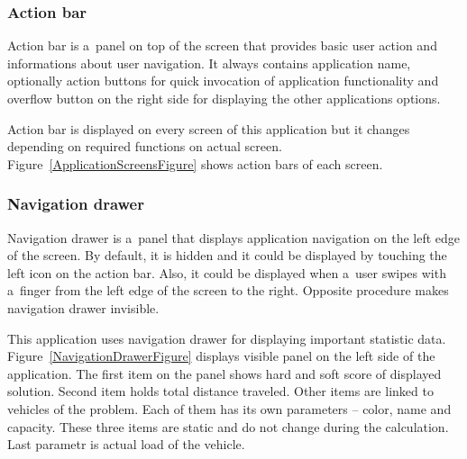 \subsubsection{Action bar}
Action bar is a~panel on top of the screen that provides basic user action and informations about user navigation. It
always contains application name, optionally action buttons for quick invocation of application functionality and
overflow button on the right side for displaying the other applications options.

Action bar is displayed on every screen of this application but it changes depending on required functions on actual
screen. Figure~\ref{ApplicationScreensFigure} shows action bars of each screen.

\subsubsection{Navigation drawer}
Navigation drawer is a~panel that displays application navigation on the left edge of the screen. By default, it is
hidden and it could be displayed by touching the left icon on the action bar. Also, it could be displayed when a~user
swipes with a~finger from the left edge of the screen to the right. Opposite procedure makes navigation drawer
invisible.

This application uses navigation drawer for displaying important statistic data. Figure~\ref{NavigationDrawerFigure}
displays visible panel on the left side of the application. The first item on the panel shows hard and soft score of
displayed solution. Second item holds total distance traveled. Other items are linked to vehicles of the problem. Each
of them has its own parameters -- color, name and capacity. These three items are static and do not change during the
calculation. Last parametr is actual load of the vehicle.

